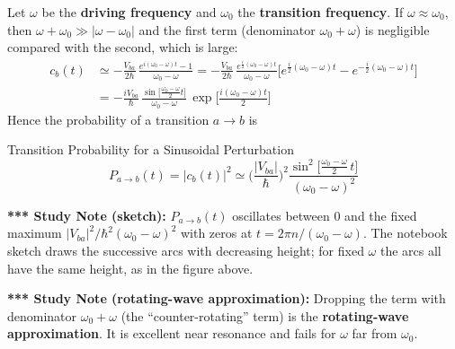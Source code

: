 \documentclass[11pt,a4paper]{article}
\begin{document}
Let $\omega$ be the \textbf{driving frequency} and $\omega_0$ the \textbf{transition frequency}. If $\omega\approx\omega_0$, then $\omega+\omega_0\gg|\omega-\omega_0|$ and the first term (denominator $\omega_0+\omega$) is negligible compared with the second, which is large:
\begin{align*}
c_b(t) &\simeq -\frac{V_{ba}}{2\hbar}\,\frac{e^{i(\omega_0-\omega)t}-1}{\omega_0-\omega}
= -\frac{V_{ba}}{2\hbar}\,\frac{e^{\frac i2(\omega_0-\omega)t}}{\omega_0-\omega}\Big[e^{\frac i2(\omega_0-\omega)t}-e^{-\frac i2(\omega_0-\omega)t}\Big]\\
&= -\frac{iV_{ba}}{\hbar}\,\frac{\sin\!\big[\frac{\omega_0-\omega}2t\big]}{\omega_0-\omega}\,\exp\Big[\frac{i(\omega_0-\omega)t}2\Big]
\end{align*}
Hence the probability of a transition $a\to b$ is
\begin{thm}{Transition Probability for a Sinusoidal Perturbation}
\[
P_{a\to b}(t) = |c_b(t)|^2 \simeq \Big(\frac{|V_{ba}|}{\hbar}\Big)^2\frac{\sin^2\!\big[\frac{\omega_0-\omega}{2}\,t\big]}{(\omega_0-\omega)^2}
\]
\end{thm}

\begin{center}
\end{center}

\textbf{*** Study Note (sketch):} $P_{a\to b}(t)$ oscillates between $0$ and the fixed maximum $|V_{ba}|^2/\hbar^2(\omega_0-\omega)^2$ with zeros at $t=2\pi n/(\omega_0-\omega)$. The notebook sketch draws the successive arcs with decreasing height; for fixed $\omega$ the arcs all have the same height, as in the figure above.

\textbf{*** Study Note (rotating-wave approximation):} Dropping the term with denominator $\omega_0+\omega$ (the ``counter-rotating'' term) is the \textbf{rotating-wave approximation}. It is excellent near resonance and fails for $\omega$ far from $\omega_0$.
\end{document}
